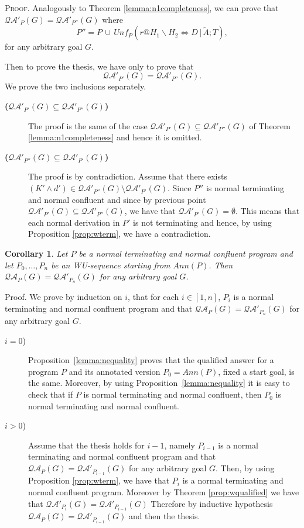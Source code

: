 \documentclass[final]{acmtrans2e}
\newtheorem{corollary}[theorem]{Corollary}
\begin{document}
\textsc{Proof.} Analogously to Theorem \ref{lemma:n1completeness}, we can prove that
$\mathcal{QA'}_{P}(G)=\mathcal{QA'}_{P''}(G)$ where
 \[
  P'' = P \, \cup \, Unf_{P}(r@H_1\backslash H_2 \Leftrightarrow D\,|\,\tilde A; T),
\]
for any arbitrary goal $G$.

Then to prove the thesis, we have only to prove that
\[\mathcal{QA'}_{P'}(G) = \mathcal{QA'}_{P''}(G).\]
We prove the two inclusions separately.
\begin{description}
  \item[{\bf ($\mathcal{QA'}_{P'}(G) \subseteq \mathcal{QA'}_{P''}(G)$) }]
  The proof is the same of the case $\mathcal{QA'}_{P'}(G) \subseteq \mathcal{QA'}_{P''}(G)$ of Theorem \ref{lemma:n1completeness} and hence it is omitted.


  \item[{\bf ($\mathcal{QA'}_{P''}(G) \subseteq \mathcal{QA'}_{P'}(G)$) }]
  The proof is by contradiction. Assume that there exists $(K'\wedge d') \in \mathcal{QA'}_{P''}(G) \setminus \mathcal{QA'}_{P'}(G)$. Since $P''$ is normal terminating and normal confluent and since by previous point
  $\mathcal{QA'}_{P'}(G) \subseteq \mathcal{QA'}_{P''}(G)$, we have that $\mathcal{QA'}_{P'}(G)= \emptyset$.
  This means that each normal derivation in $P'$ is not terminating and hence, by using Proposition \ref{prop:wterm}, we have a contradiction.

\end{description}
\noindent{$\Box$}

\begin{corollary}\label{lemma:wcompleteness}
 Let $P$ be a normal terminating and normal confluent program and let $P_0, \ldots, P_n$ be an WU-sequence starting from                                                 $Ann(P)$. Then
$\mathcal{QA}_{P}(G)=\mathcal{QA'}_{P_n}(G)$ for any arbitrary goal
$G$.
\end{corollary}

{\sc Proof.} We prove by induction on $i$, that for each $i \in [1,n]$, $P_i$ is a normal terminating and normal confluent program and that $\mathcal{QA}_{P}(G)=\mathcal{QA'}_{P_n}(G)$ for any arbitrary goal
$G$.
\begin{description}
  \item[$i=0$)] Proposition~\ref{lemma:nequality} proves that the qualified answer for
a program $P$ and its annotated version $P_0=Ann(P)$, fixed a start goal, is the same. Moreover, by using Proposition~\ref{lemma:nequality} it is easy to check that if $P$ is normal terminating and normal confluent, then $P_0$ is normal terminating and normal confluent.
  \item[$i>0$)] Assume that the thesis holds for $i-1$, namely $P_{i-1}$ is a normal terminating and normal confluent program and that $\mathcal{QA}_{P}(G)=\mathcal{QA'}_{P_{i-1}}(G)$ for any arbitrary goal
$G$. Then, by using Proposition \ref{prop:wterm}, we have that $P_{i}$ is a normal terminating and normal confluent program. Moreover by Theorem \ref{prop:wqualified} we have that $\mathcal{QA'}_{P_i}(G)=\mathcal{QA'}_{P_{i-1}}(G)$ Therefore by inductive hypothesis $\mathcal{QA}_{P}(G)=\mathcal{QA'}_{P_{i-1}}(G)$ and then the thesis.
\end{description}
\end{document}
